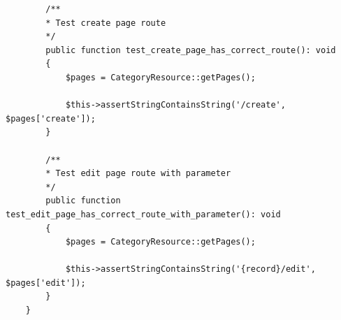 \begin{verbatim}
        /**
        * Test create page route
        */
        public function test_create_page_has_correct_route(): void
        {
            $pages = CategoryResource::getPages();
            
            $this->assertStringContainsString('/create', $pages['create']);
        }
        
        /**
        * Test edit page route with parameter
        */
        public function test_edit_page_has_correct_route_with_parameter(): void
        {
            $pages = CategoryResource::getPages();
            
            $this->assertStringContainsString('{record}/edit', $pages['edit']);
        }
    }
\end{verbatim}
